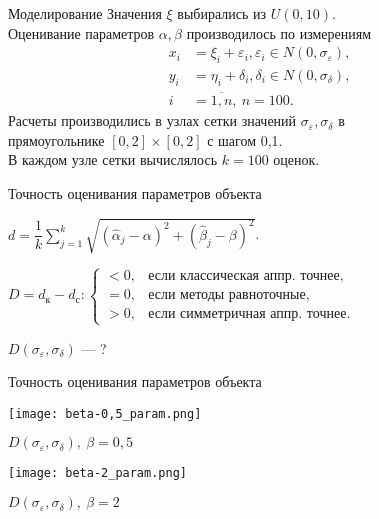 \documentclass[hyperref={pdftex,unicode}]{beamer}
\begin{document}
\begin{frame}{Моделирование}
  Значения \( \xi \) выбирались из \( U(0, 10) \). \\
  Оценивание параметров \( \alpha, \beta \) производилось по измерениям
  \begin{align*}
    x_i &= \xi_i + \varepsilon_i, \varepsilon_i \in N(0, \sigma_{\varepsilon}), \\
    y_i &= \eta_i + \delta_i, \delta_i \in N(0, \sigma_{\delta}), \\
    i &= \overline{1, n}, \: n = 100.
  \end{align*}
  Расчеты производились в узлах сетки значений \( \sigma_{\varepsilon}, \sigma_{\delta} \) в \\
  прямоугольнике  \( [0, 2] \times [0, 2] \) с шагом 0{,}1. \\
  В каждом узле сетки вычислялось \( k = 100 \) оценок.
\end{frame}

\begin{frame}{Точность оценивания параметров объекта}
  \begin{center}\large
    \( d = \dfrac{1}{k} \sum_{j=1}^k \sqrt{(\hat{\alpha}_j - \alpha)^2 + (\hat{\beta}_j - \beta)^2} \).

    \bigskip
    \( D = d_{\text{к}} - d_{\text{с}}:
    \begin{cases}
      < 0, & \text{если классическая аппр. точнее}, \\
      = 0, & \text{если методы равноточные}, \\
      > 0, & \text{если симметричная аппр. точнее}.
    \end{cases} \)

    \bigskip
    \( D(\sigma_{\varepsilon}, \sigma_{\delta}) \) --- ?
  \end{center}
\end{frame}

\begin{frame}{Точность оценивания параметров объекта}
  \begin{minipage}[h]{0.49\linewidth}\centering
    \texttt{[image: beta-0,5\_param.png]}

    \bigskip
    \scriptsize\( D(\sigma_{\varepsilon}, \sigma_{\delta}), \: \beta = 0{,}5 \)
  \end{minipage}
  \hfill
  \begin{minipage}[h]{0.49\linewidth}\centering
    \texttt{[image: beta-2\_param.png]}

    \bigskip
    \scriptsize\( D(\sigma_{\varepsilon}, \sigma_{\delta}), \: \beta = 2 \)
  \end{minipage}
\end{frame}
\end{document}
